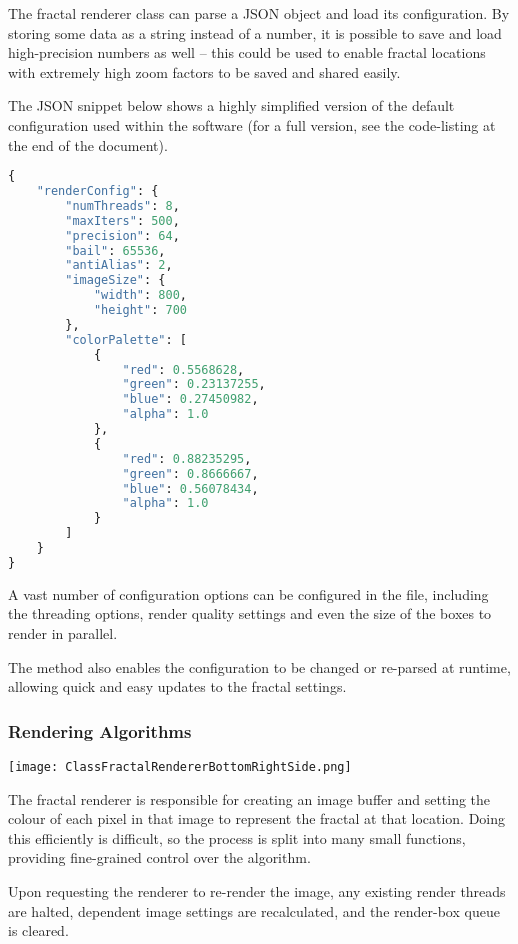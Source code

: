 The fractal renderer class can parse a JSON object and load its configuration. By storing some data as a string instead of a number, it is possible to save and load high-precision numbers as well -- this could be used to enable fractal locations with extremely high zoom factors to be saved and shared easily.

\vspace{0.5cm}
\noindent
The JSON snippet below shows a highly simplified version of the default configuration used within the software (for a full version, see the code-listing at the end of the document).

\begin{lstlisting}[language=python]
{
	"renderConfig": {
		"numThreads": 8,
		"maxIters": 500,
		"precision": 64,
		"bail": 65536,
		"antiAlias": 2,
		"imageSize": {
			"width": 800,
			"height": 700
		},
		"colorPalette": [
			{
				"red": 0.5568628,
				"green": 0.23137255,
				"blue": 0.27450982,
				"alpha": 1.0
			},
			{
				"red": 0.88235295,
				"green": 0.8666667,
				"blue": 0.56078434,
				"alpha": 1.0
			}
		]
	}
}
\end{lstlisting}

A vast number of configuration options can be configured in the file, including the threading options, render quality settings and even the size of the boxes to render in parallel.

The  method also enables the configuration to be changed or re-parsed at runtime, allowing quick and easy updates to the fractal settings.

\subsubsection{Rendering Algorithms}

\FloatBarrier
\begin{figure*}[htp]
    \centering
    \texttt{[image: ClassFractalRendererBottomRightSide.png]}
\end{figure*}
\FloatBarrier

The fractal renderer is responsible for creating an image buffer and setting the colour of each pixel in that image to represent the fractal at that location. Doing this efficiently is difficult, so the process is split into many small functions, providing fine-grained control over the algorithm.

Upon requesting the renderer to re-render the image, any existing render threads are halted, dependent image settings are recalculated, and the render-box queue is cleared.

